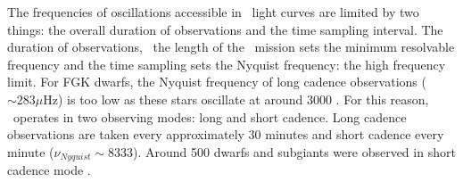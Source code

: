 
The frequencies of oscillations accessible in \kepler\ light curves are
limited by two things: the overall duration of observations and the time
sampling interval.
The duration of observations, \ie\ the length of the \kepler\ mission sets the
minimum resolvable frequency and the time sampling sets the Nyquist frequency:
the high frequency limit.
For FGK dwarfs, the Nyquist frequency of long cadence observations ($\sim 283
\mu$Hz) is too low as these stars oscillate at around 3000 \uHz.
For this reason, \kepler\ operates in two observing modes: long and short
cadence.
Long cadence observations are taken every approximately 30 minutes and short
cadence every minute ($\nu_{Nyquist} \sim 8333$\uHz).
Around 500 dwarfs and subgiants were observed in short cadence mode
\citet{Chaplin2014}.

